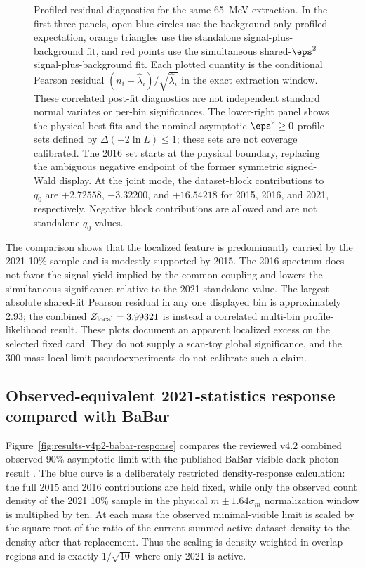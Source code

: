 \begin{figure}[H]
\centering
{}
\caption{Profiled residual diagnostics for the same 65~MeV extraction. In the
first three panels, open blue circles use the background-only profiled
expectation, orange triangles use the standalone signal-plus-background fit,
and red points use the simultaneous shared-$\eps^2$ signal-plus-background fit.
Each plotted quantity is the conditional Pearson residual
$(n_i-\widehat{\lambda}_i)/\sqrt{\widehat{\lambda}_i}$ in the exact extraction
window. These correlated post-fit diagnostics are not independent standard
normal variates or per-bin significances. The lower-right panel shows the
physical best fits and the nominal asymptotic $\eps^2\geq0$ profile sets
defined by $\Delta(-2\ln L)\leq1$; these sets are not coverage calibrated.
The 2016 set starts at the physical boundary, replacing the ambiguous negative
endpoint of the former symmetric signed-Wald display. At the joint mode, the
dataset-block contributions to $q_0$ are $+2.72558$, $-3.32200$, and
$+16.54218$ for 2015, 2016, and 2021, respectively. Negative block
contributions are allowed and are not standalone $q_0$ values.}
\label{fig:results-v4p2-m065-residuals}
\end{figure}

The comparison shows that the localized feature is predominantly carried by the
2021 10\% sample and is modestly supported by 2015. The 2016 spectrum does not
favor the signal yield implied by the common coupling and lowers the
simultaneous significance relative to the 2021 standalone value. The largest
absolute shared-fit Pearson residual in any one displayed bin is approximately
2.93; the combined $Z_{\mathrm{local}}=3.99321$ is instead a
correlated multi-bin profile-likelihood result. These plots document an
apparent localized excess on the selected fixed card. They do not supply a
scan-toy global significance, and the 300 mass-local limit pseudoexperiments do
not calibrate such a claim.

\subsection{Observed-equivalent 2021-statistics response compared with BaBar}
\label{sec:results-v4p2-babar-response}

Figure~\ref{fig:results-v4p2-babar-response} compares the reviewed v4.2
combined observed 90\% asymptotic \CLs{} limit with the published BaBar visible
dark-photon result \cite{BaBarDarkPhoton2014}.  The blue curve is a deliberately
restricted density-response calculation: the full 2015 and 2016 contributions
are held fixed, while only the observed count density of the 2021 10\% sample
in the physical $m\pm1.64\sigma_m$ normalization window is multiplied by ten.
At each mass the observed minimal-visible limit is scaled by the square root of
the ratio of the current summed active-dataset density to the density after
that replacement.  Thus the scaling is density weighted in overlap regions and
is exactly $1/\sqrt{10}$ where only 2021 is active.

